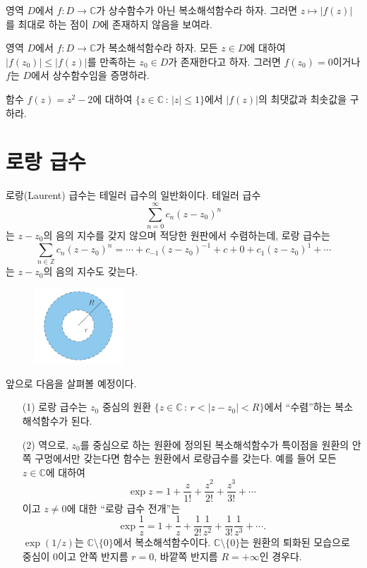 \begin{salt_exercise} \label{ex-4-26}
영역 $D$에서 $f:D\to \mathbb C$가 상수함수가 아닌 복소해석함수라 하자.
그러면 $z\mapsto |f(z)|$를 최대로 하는 점이 $D$에 존재하지 않음을 보여라.
\end{salt_exercise}

\begin{salt_exercise} [최소절대값정리] \label{ex-4-27}
영역 $D$에서 $f:D\to \mathbb C$가 복소해석함수라 하자.
모든 $z\in D$에 대하여 $|f(z_0)| \le |f(z)|$를 만족하는 $z_0\in D$가 존재한다고 하자.
그러면 $f(z_0)=0$이거나 $f$는 $D$에서 상수함수임을 증명하라.
\end{salt_exercise}

\begin{salt_exercise} \label{ex-4-28}
함수 $f(z)=z^2-2$에 대하여
$\{z\in\mathbb C \,:\, |z|\le 1\}$에서 $|f(z)|$의 최댓값과 최솟값을 구하라.
\end{salt_exercise}

\section{로랑 급수}

로랑(Laurent) 급수는 테일러 급수의 일반화이다. 
테일러 급수
\[
\sum_{n=0}^\infty c_n(z-z_0)^n
\]
는 $z-z_0$의 음의 지수를 갖지 않으며 적당한 원판에서 수렴하는데,
로랑 급수는
\[
\sum_{n\in \mathbb Z} c_n(z-z_0)^n
= \cdots + c_{-1}(z-z_0)^{-1} + c+0 + c_1(z-z_0)^1 + \cdots
\]
는 $z-z_0$의 음의 지수도 갖는다.

\begin{figure}[h!]
\begin{center}
\includegraphics[width=0.3\textwidth]{./SaltChapter/fig-4-0-7}
\end{center}
\end{figure}

앞으로 다음을 살펴볼 예정이다.
\begin{itemize}
\item[(1)] 로랑 급수는 $z_0$ 중심의 
원환 $\{ z\in \mathbb C \,:\, r < |z-z_0| <R\}$에서 ``수렴''하는
복소해석함수가 된다.
\item[(2)] 역으로, $z_0$를 중심으로 하는 원환에 정의된 복소해석함수가
특이점을 원환의 안쪽 구멍에서만 갖는다면
함수는 원환에서 로랑급수를 갖는다. 예를 들어 모든 $z\in \mathbb C$에 대하여
\[
\exp z = 1 + \dfrac{z}{1!} + \dfrac{z^2}{2!} + \dfrac{z^3}{3!} + \cdots
\]
이고 $z\ne0$에 대한 ``로랑 급수 전개''는
\[
\exp \dfrac1z = 1 + \dfrac{1}{z} + \dfrac{1}{2!}\dfrac1{z^2} + \dfrac{1}{3!}\dfrac1{z^3} + \cdots.
\]
$\exp(1/z)$는 $\mathbb C\setminus \{0\}$에서 복소해석함수이다.
$\mathbb C\setminus \{0\}$는 원환의 퇴화된 모습으로
중심이 $0$이고 안쪽 반지름 $r=0$, 바깥쪽 반지름 $R=+\infty$인 경우다.
\end{itemize}

